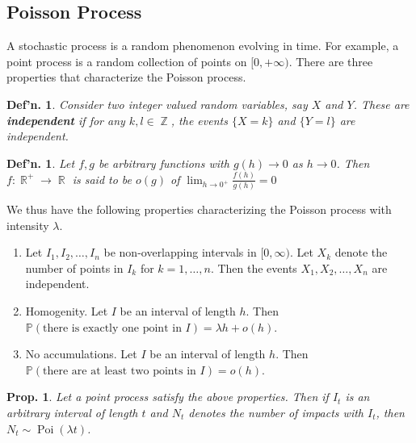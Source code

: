 \documentclass[12pt, a4paper]{book}
\DeclareMathOperator{\Z}{\mathbb{Z}}
\DeclareMathOperator{\R}{\mathbb{R}}
\DeclareMathOperator{\Poi}{Poi}
\renewcommand{\Pr}{\mathbb{P}}
\newtheorem{definition}[theorem]{Def'n.}
\newtheorem{proposition}[theorem]{Prop.}
\theoremstyle{nonumberplain}
\begin{document}
\subsection{Poisson Process}
A stochastic process is a random phenomenon evolving in time.
For example, a point process is a random collection of points on $[0,+\infty)$.
There are three properties that characterize the Poisson process.
\begin{definition}
    Consider two integer valued random variables, say $X$ and $Y$.
    These are \textbf{independent} if for any $k,l\in\Z$, the events $\{X=k\}$ and $\{Y=l\}$ are independent.
\end{definition}
\begin{definition}
    Let $f,g$ be arbitrary functions with $g(h)\to 0$ as $h\to 0$.
    Then $f:\R^+\to\R$ is said to be $o(g)$ of $\lim_{h\to 0^+}\frac{f(h)}{g(h)}=0$
\end{definition}
We thus have the following properties characterizing the Poisson process with intensity $\lambda$.
\begin{enumerate}
    \item Let $I_1,I_2,\ldots,I_n$ be non-overlapping intervals in $[0,\infty)$.
        Let $X_k$ denote the number of points in $I_k$ for $k=1,\ldots,n$.
        Then the events $X_1,X_2,\ldots,X_n$ are independent.
    \item Homogenity.
        Let $I$ be an interval of length $h$.
        Then $\Pr(\text{there is exactly one point in $I$})=\lambda h+o(h)$.
    \item No accumulations.
        Let $I$ be an interval of length $h$.
        Then $\Pr(\text{there are at least two points in $I$})=o(h)$.
\end{enumerate}
\begin{proposition}
    Let a point process satisfy the above properties.
    Then if $I_t$ is an arbitrary interval of length $t$ and $N_t$ denotes the number of impacts with $I_t$, then $N_t\sim\Poi(\lambda t)$.
\end{proposition}
\end{document}
